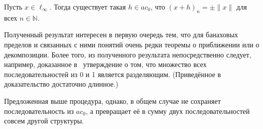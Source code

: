 \begin{corollary}
	Пусть $x\in\ell_\infty$.
	Тогда существует такая $h\in ac_0$, что $(x+h)_n =\pm \|x\|$ для всех $n\in\mathbb N$.
\end{corollary}

Полученный результат интересен в первую очередь тем, что для банаховых пределов и связанных с ними понятий
очень редки теоремы о приближении или о декомпозиции.
Более того, из полученного результата непосредственно следует, например,
доказанное в~\cite{semenov2010characteristic} утверждение о том, что множество всех последовательностей из 0 и 1 является разделяющим.
(Приведённое в~\cite{semenov2010characteristic} доказательство достаточно длинное.)

Предложенная выше процедура, однако, в общем случае не сохраняет последовательность из $ac_0$,
а превращает её в сумму двух последовательностей совсем другой структуры.
